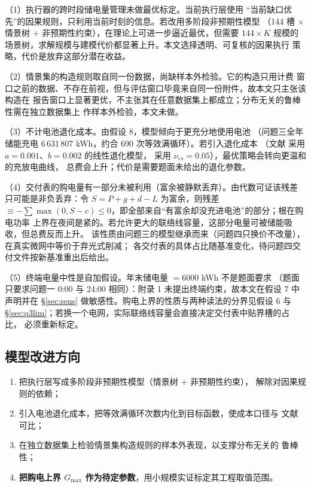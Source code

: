 \documentclass[withoutpreface]{cumcmthesis}
\begin{document}
\noindent（1）执行器的跨时段储电量管理未做最优标定。当前执行层使用
“当前缺口优先”的因果规则，只利用当前时刻的信息。若改用多阶段非预期性模型
（144 槽 $\times$ 情景树 $+$ 非预期性约束），在理论上可进一步逼近最优，但需要
$144\times K$ 规模的场景树，求解规模与建模代价都显著上升。本文选择透明、可复核的因果执行
策略，代价是放弃这部分潜在收益。

\noindent（2）情景集的构造规则取自同一份数据，尚缺样本外检验。它的构造只用计费
窗口之前的数据、不存在前视，但与评估窗口毕竟来自同一份附件，故本文只主张该构造在
报告窗口上显著更优，不主张其在任意数据集上都成立；分布无关的鲁棒性需在独立数据集上
作样本外检验，本文未做。

\noindent（3）不计电池退化成本。由假设 8，模型倾向于更充分地使用电池
（问题三全年储能充电 6\,631\,807 kWh，约合 690 次等效满循环）。若引入退化成本
（文献 \cite{wu2015} 采用 $a=0.001$、$b=0.002$ 的线性退化模型，
\cite{hou2023} 采用 $\nu_{es}=0.05$），最优策略会转向更温和的充放电曲线，
总费会上升；代价是需要题面未给出的退化参数。

\noindent（4）交付表的购电量有一部分未被利用（富余被静默丢弃）。由代数可证该残差
只可能是非负丢弃：令 $S=P+g+d-L$ 为富余，则残差
$\equiv-\sum\max(0,S-c)\le0$，即全部来自“有富余却没充进电池”的部分；根在购电功率
上界在夜间是紧的。若允许更大的联络线容量，这部分电量可被储能吸收，但总费反而上升。
该性质由问题三的模型继承而来（问题四只换价不改量），在真实微网中等价于弃光式削减；
各交付表的具体占比随基准变化，待问题四交付文件按新基准重出后给出。

\noindent（5）终端电量中性是自加假设。年末储电量 $=6000$ kWh 不是题面要求
（题面只要求问题一 0:00 与 24:00 相同）：附录 1 未提出终端约束，故本文在假设 7 中
声明并在 \S\ref{sec:sens} 做敏感性。购电上界的性质与两种读法的分界见假设 6 与
\S\ref{sec:q3lim}；若换一个电网，实际联络线容量会直接决定交付表中贴界槽的占比，
必须重新标定。

\subsection{模型改进方向}

\begin{enumerate}[itemsep=1pt, topsep=2pt]
  \item 把执行层写成多阶段非预期性模型（情景树 $+$ 非预期性约束），
        解除对因果规则的依赖；
  \item 引入电池退化成本，把等效满循环次数内化到目标函数，使成本口径与
        文献可比；
  \item 在独立数据集上检验情景集构造规则的样本外表现，以支撑分布无关的
        鲁棒性；
  \item \textbf{把购电上界 $G_{\max}$ 作为待定参数}，用小规模实证标定其工程取值范围。
\end{enumerate}
\end{document}
